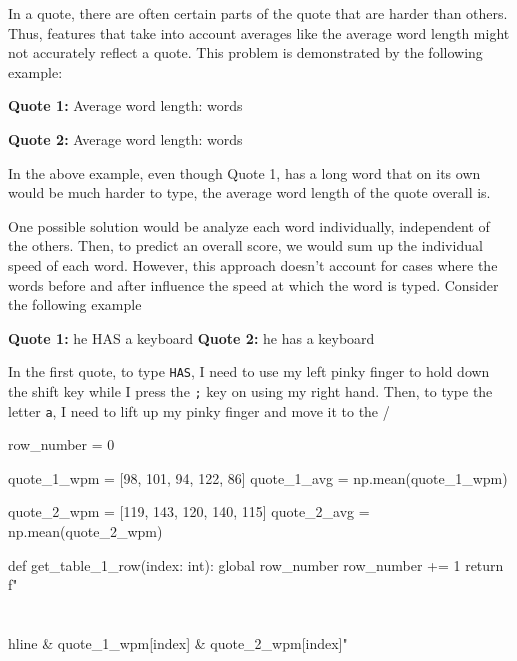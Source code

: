 \documentclass{article}
\newcommand{\code}[1]{\texttt{#1}}
\newenvironment{zeroindent}
  {\par\setlength{\parindent}{0pt}}
  {\par}
\begin{document}
In a quote, there are often certain parts of the quote that are harder than others. Thus, features that take into account averages like the average word length might not accurately reflect a quote. This problem is demonstrated by the following example:

\medskip

\begin{zeroindent}
	\textbf{Quote 1:} 
	\newline
	Average word length:  words

	\smallskip

	\textbf{Quote 2:} 
	\newline
	Average word length:  words
\end{zeroindent}

\medskip

In the above example, even though Quote 1, has a long word that on its own would be much harder to type, the average word length of the quote overall is.

One possible solution would be analyze each word individually, independent of the others. Then, to predict an overall score, we would sum up the individual speed of each word. However, this approach doesn't account for cases where the words before and after influence the speed at which the word is typed. Consider the following example

\medskip

\begin{zeroindent}
	\textbf{Quote 1:} he HAS a keyboard
	\textbf{Quote 2:} he has a keyboard
\end{zeroindent}

In the first quote, to type \code{HAS}, I need to use my left pinky finger to hold down the shift key while I press the \code{;} key on using my right hand. Then, to type the letter \code{a}, I need to lift up my pinky finger and move it to the /

\begin{pycode}
row_number = 0

quote_1_wpm = [98, 101, 94, 122, 86]
quote_1_avg = np.mean(quote_1_wpm)

quote_2_wpm = [119, 143, 120, 140, 115]
quote_2_avg = np.mean(quote_2_wpm)

def get_table_1_row(index: int):
	global row_number
	row_number += 1
	return f"\\\\\\hline {} & {quote_1_wpm[index]} & {quote_2_wpm[index]}"
\end{pycode}
\end{document}
